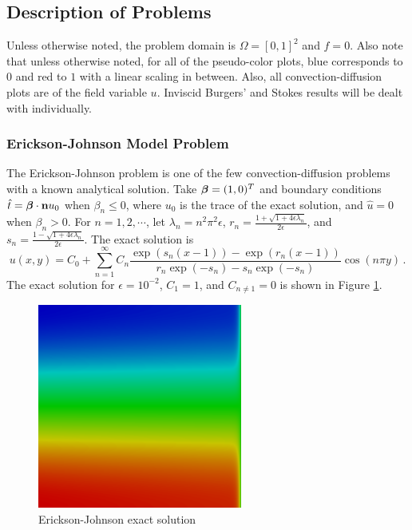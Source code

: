 \documentclass[Proposal.tex]{subfiles}
\begin{document}
\subsection{Description of Problems}\label{sec:problemDescriptions}
Unless otherwise noted, the problem domain is $\Omega=[0,1]^2$ and $f=0$. Also
note that unless otherwise noted, for all of the
pseudo-color plots, blue corresponds to $0$ and red to $1$ with a linear
scaling in between. Also, all convection-diffusion plots are of the field variable $u$.
Inviscid Burgers' and Stokes results will be dealt with individually.

\subsubsection{Erickson-Johnson Model Problem}
The Erickson-Johnson problem is one of the few convection-diffusion problems
with a known analytical solution. Take
$\boldsymbol\beta=(1,0)^T$ and boundary conditions $\hat t=\boldsymbol\beta\cdot\mathbf{n} u_0$ when
$\beta_n\le0$, where $u_0$ is the trace of the exact solution, and $\hat u=0$
when $\beta_n>0$. For
$n=1,2,\cdots$, let
$\lambda_n=n^2\pi^2\epsilon$,
$r_n=\frac{1+\sqrt{1+4\epsilon\lambda_n}}{2\epsilon}$, and
$s_n=\frac{1-\sqrt{1+4\epsilon\lambda_n}}{2\epsilon}$. The exact solution
is
\begin{equation}
u(x,y)=C_0+\sum_{n=1}^\infty C_n\frac{\exp(s_n(x-1))-\exp(r_n(x-1))}
{r_n\exp(-s_n)-s_n\exp(-s_n)}\cos(n\pi y)\,.
\label{eq:ericksonExact}
\end{equation}
The exact solution for $\epsilon=10^{-2}$, $C_1=1$, and $C_{n\neq1}=0$ is
shown in Figure \ref{fig:erickson}.

\begin{figure}[p]
\centering
\includegraphics[width=0.6\textwidth]{figs/Erickson/exact.png}
\caption{Erickson-Johnson exact solution}
\label{fig:erickson}
\end{figure}
\end{document}
